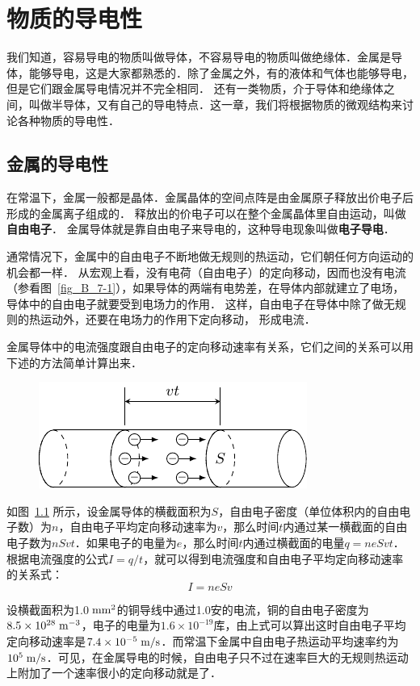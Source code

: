 \chapter{物质的导电性}\label{chapter-conductivity-of-matter}

我们知道，容易导电的物质叫做导体，不容易导电的物质叫做绝缘体．金属是导体，能够导电，这是大家都熟悉的．除了金属之外，有的液体和气体也能够导电，但是它们跟金属导电情况并不完全相同．
还有一类物质，介于导体和绝缘体之间，叫做半导体，又有自己的导电特点．这一章，我们将根据物质的微观结构来讨论各种物质的导电性．

\section{金属的导电性}

在常温下，金属一般都是晶体．金属晶体的空间点阵是由金属原子释放出价电子后形成的金属离子组成的．
释放出的价电子可以在整个金属晶体里自由运动，叫做\textbf{自由电子}．
金属导体就是靠自由电子来导电的，这种导电现象叫做\textbf{电子导电}．


通常情况下，金属中的自由电子不断地做无规则的热运动，它们朝任何方向运动的机会都一样．
从宏观上看，没有电荷（自由电子）的定向移动，因而也没有电流（参看图~\ref{fig_B_7-1}），如果导体的两端有电势差，在导体内部就建立了电场，导体中的自由电子就要受到电场力的作用．
这样，自由电子在导体中除了做无规则的热运动外，还要在电场力的作用下定向移动，
形成电流．

金属导体中的电流强度跟自由电子的定向移动速率有关系，它们之间的关系可以用下述的方法简单计算出来．
\begin{figure}[htbp]
    \centering
    \includegraphics{fig/B/8-1.pdf}
    \caption{}\label{fig_B_8-1}
\end{figure}

如图~\ref{fig_B_8-1} 所示，设金属导体的横截面积为$S$，自由电子密度（单位体积内的自由电子数）为$n$，自由电子平均定向移动速率为$v$，那么时间$t$内通过某一横截面的自由电子数为$nSvt$．如果电子的电量为$e$，那么时间$t$内通过横截面的电量$q=neSvt$．根据电流强度的公式$I=q/t$，就可以得到电流强度和自由电子平均定向移动速率的关系式：
\[I=neSv\]

设横截面积为1.0$\;\text{mm}^2$的铜导线中通过1.0安的电流，铜的自由电子密度为$8.5\times10^{28} \;\text{m}^{-3}$，电子的电量为$1.6\times10^{-19}$库，由上式可以算出这时自由电子平均定向移动速率是$7. 4\times10^{-5}\;\text{m}/\text{s}$．而常温下金属中自由电子热运动平均速率约为$10^5\;\text{m}/\text{s}$．可见，在金属导电的时候，自由电子只不过在速率巨大的无规则热运动上附加了一个速率很小的定向移动就是了．

